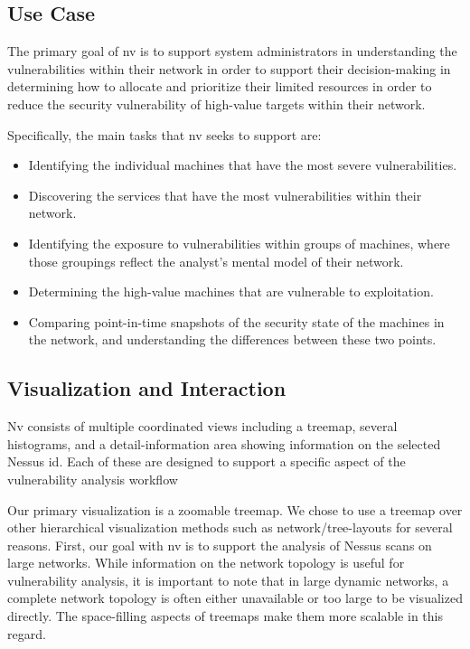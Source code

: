 \documentclass{acm_proc_article-sp}
\begin{document}

\subsection{Use Case}

The primary goal of nv is to support system administrators in understanding the
vulnerabilities within their network in order to support their
decision-making in determining how to allocate and prioritize their
limited resources in order to reduce the security vulnerability of
high-value targets within their network.

Specifically, the main tasks that nv seeks to support are:

\begin{itemize}
  \item Identifying the individual machines that have the most severe vulnerabilities.
  \item Discovering the services that have the most vulnerabilities within their network.
  \item Identifying the exposure to vulnerabilities within groups of machines, where those groupings reflect the analyst's mental model of their network.
  \item Determining the high-value machines that are vulnerable to exploitation.
  \item Comparing point-in-time snapshots of the security state of the machines in the network, and understanding the differences between these two points.
\end{itemize}

\subsection{Visualization and Interaction}
Nv consists of multiple coordinated views including a treemap, several histograms, and a detail-information area showing information on the selected Nessus id.
Each of these are designed to support a specific aspect of the vulnerability analysis workflow

Our primary visualization is a zoomable treemap\cite{Shneiderman:1992:TVT:102377.115768}.
We chose to use a treemap over other hierarchical visualization methods such as network/tree-layouts for several reasons.
First, our goal with nv is to support the analysis of Nessus scans on large networks.
While information on the network topology is useful for vulnerability analysis, it is important to note that in large dynamic networks, a complete network topology is often either unavailable or too large to be visualized directly.
The space-filling aspects of treemaps make them more scalable in this regard.
\end{document}
